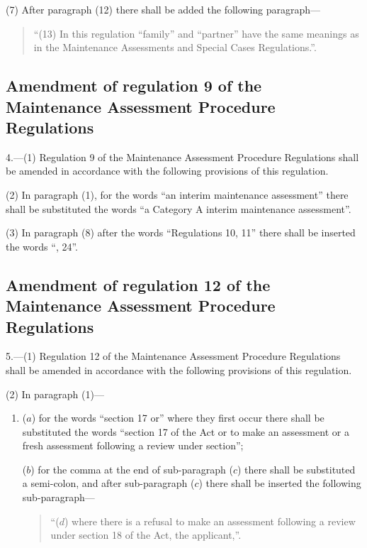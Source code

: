 \documentclass[12pt,a4paper]{article}
\begin{document}
(7) After paragraph (12) there shall be added the following paragraph---
\begin{quotation}
“(13) In this regulation “family” and “partner” have the same meanings as in the Maintenance Assessments and Special Cases Regulations.”.
\end{quotation}

\subsection[4. Amendment of regulation 9 of the Maintenance Assessment Procedure Regulations]{Amendment of regulation 9 of the Maintenance Assessment Procedure Regulations}

4.—(1) Regulation 9 of the Maintenance Assessment Procedure Regulations shall be amended in accordance with the following provisions of this regulation.

(2) In paragraph (1), for the words “an interim maintenance assessment” there shall be substituted the words “a Category A interim maintenance assessment”.

(3) In paragraph (8) after the words “Regulations 10, 11” there shall be inserted the words “, 24”.

\subsection[5. Amendment of regulation 12 of the Maintenance Assessment Procedure Regulations]{Amendment of regulation 12 of the Maintenance Assessment Procedure Regulations}

5.—(1) Regulation 12 of the Maintenance Assessment Procedure Regulations shall be amended in accordance with the following provisions of this regulation.

(2) In paragraph (1)---
\begin{enumerate}\item[]
($a$) for the words “section 17 or” where they first occur there shall be substituted the words “section 17 of the Act or to make an assessment or a fresh assessment following a review under section”;

($b$) for the comma at the end of sub-paragraph ($c$) there shall be substituted a semi-colon, and after sub-paragraph ($c$) there shall be inserted the following sub-paragraph---
\begin{quotation}
“($d$) where there is a refusal to make an assessment following a review under section 18 of the Act, the applicant,”.
\end{quotation}
\end{enumerate}
\end{document}
